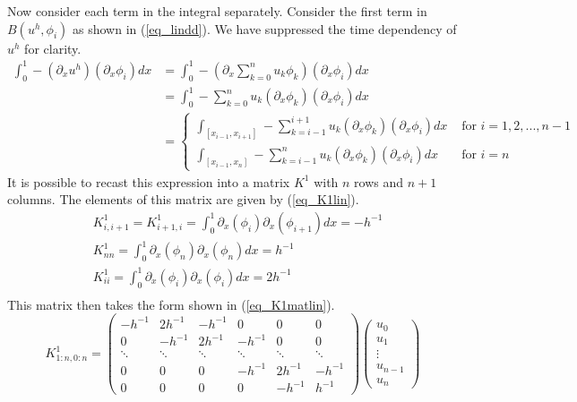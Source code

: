 \documentclass[11pt,fleqn]{article}
\theoremstyle{defstyle}
\begin{document}
Now consider each term in the integral separately. Consider the first term in $B(u^h, \phi_i)$ as shown in (\ref{eq_lindd}). We have suppressed the time dependency of $u^h$ for clarity.
\begin{equation}
\begin{aligned}
\int_0^1 -(\partial_xu^h)(\partial_x\phi_i)dx &= \int_0^1 -(\partial_x \sum_{k=0}^{n} u_k\phi_k)(\partial_x\phi_i)dx \\
&= \int_0^1 -\sum_{k=0}^{n} u_k(\partial_x\phi_k)(\partial_x\phi_i)dx \\
&= \begin{cases}
\int_{[x_{i-1},x_{i+1}]}-\sum_{k=i-1}^{i+1} u_k(\partial_x\phi_k)(\partial_x\phi_i)dx &\text{ for } i=1,2,..., n-1 \\
\int_{[x_{i-1},x_{n}]}-\sum_{k=i-1}^{n} u_k(\partial_x\phi_k)(\partial_x\phi_i)dx &\text{ for } i=n
\end{cases}
\end{aligned}
\label{eq_lindd}
\end{equation}
It is possible to recast this expression into a matrix $K^1$ with $n$ rows and $n+1$ columns. The elements of this matrix are given by (\ref{eq_K1lin}).
\begin{equation}
\begin{aligned}
&K^1_{i,i+1}=K^1_{i+1,i}=\int^1_0 \partial_x(\phi_i)\partial_x(\phi_{i+1})dx = -h^{-1} \\
&K^1_{nn} = \int^1_0 \partial_x(\phi_n)\partial_x(\phi_{n})dx = h^{-1} \\
&K^1_{ii} = \int^1_0 \partial_x(\phi_i)\partial_x(\phi_{i})dx = 2h^{-1} \\
\end{aligned}
\label{eq_K1lin}
\end{equation}
This matrix then takes the form shown in (\ref{eq_K1matlin}).
\begin{equation}
K^1_{1:n,0:n} = \begin{pmatrix}
-h^{-1} & 2h^{-1} & -h^{-1} & 0 & 0 &  0\\
0 & -h^{-1} & 2h^{-1} & -h^{-1} & 0 & 0  \\
\ddots & \ddots & \ddots & \ddots & \ddots & \ddots \\
0 & 0 & 0  & -h^{-1} & 2h^{-1}& -h^{-1} \\
0 & 0 & 0 & 0 & -h^{-1} & h^{-1}   
\end{pmatrix}
\begin{pmatrix}
u_0 \\ u_1 \\ \vdots \\ u_{n-1} \\ u_n
\end{pmatrix}
\label{eq_K1matlin}
\end{equation}
\end{document}
